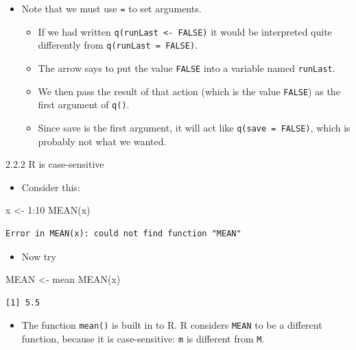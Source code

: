 \documentclass[
  9pt,
  a4paper,
  ignorenonframetext,
  notheorems]{beamer}
\newenvironment{Shaded}{\begin{snugshade}}{\end{snugshade}}
\newcommand{\DecValTok}[1]{\textcolor[rgb]{0.68,0.00,0.00}{#1}}
\newcommand{\FunctionTok}[1]{\textcolor[rgb]{0.28,0.35,0.67}{#1}}
\newcommand{\NormalTok}[1]{\textcolor[rgb]{0.00,0.23,0.31}{#1}}
\newcommand{\OtherTok}[1]{\textcolor[rgb]{0.00,0.23,0.31}{#1}}
\newcommand{\SpecialCharTok}[1]{\textcolor[rgb]{0.37,0.37,0.37}{#1}}
\providecommand{\tightlist}{%
  \setlength{\itemsep}{0pt}\setlength{\parskip}{0pt}}\usepackage{longtable,booktabs,array}
\begin{document}
\begin{frame}[fragile]
\begin{itemize}
\tightlist
\item
  Note that we must use \texttt{=} to set arguments.

  \begin{itemize}
  \tightlist
  \item
    If we had written \texttt{q(runLast\ \textless{}-\ FALSE)} it would
    be interpreted quite differently from \texttt{q(runLast\ =\ FALSE)}.
  \item
    The arrow says to put the value \texttt{FALSE} into a variable named
    \texttt{runLast}.
  \item
    We then pass the result of that action (which is the value
    \texttt{FALSE}) as the first argument of \texttt{q()}.
  \item
    Since save is the first argument, it will act like
    \texttt{q(save\ =\ FALSE)}, which is probably not what we wanted.
  \end{itemize}
\end{itemize}
\end{frame}

\begin{frame}[fragile]{2.2.2 R is case-sensitive}
\protect\hypertarget{r-is-case-sensitive}{}
\begin{itemize}
\tightlist
\item
  Consider this:
\end{itemize}

\begin{Shaded}
\begin{Highlighting}[]
\NormalTok{x }\OtherTok{\textless{}{-}} \DecValTok{1}\SpecialCharTok{:}\DecValTok{10}
\FunctionTok{MEAN}\NormalTok{(x)}
\end{Highlighting}
\end{Shaded}

\begin{verbatim}
Error in MEAN(x): could not find function "MEAN"
\end{verbatim}

\begin{itemize}
\tightlist
\item
  Now try
\end{itemize}

\begin{Shaded}
\begin{Highlighting}[]
\NormalTok{MEAN }\OtherTok{\textless{}{-}}\NormalTok{ mean}
\FunctionTok{MEAN}\NormalTok{(x)}
\end{Highlighting}
\end{Shaded}

\begin{verbatim}
[1] 5.5
\end{verbatim}

\begin{itemize}
\tightlist
\item
  The function \texttt{mean()} is built in to R. R considers
  \texttt{MEAN} to be a different function, because it is
  case-sensitive: \texttt{m} is different from \texttt{M}.
\end{itemize}
\end{frame}
\end{document}
